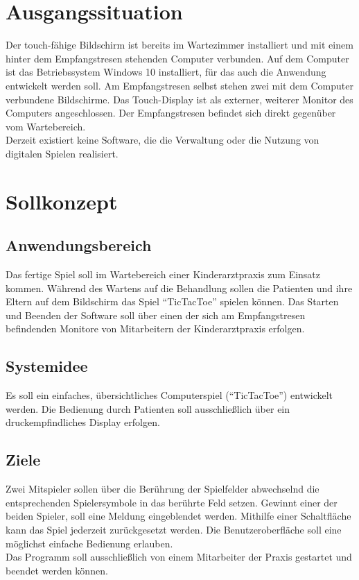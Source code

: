 \documentclass[12pt]{article}
\begin{document}
\section{Ausgangssituation}
Der touch-fähige Bildschirm ist bereits im Wartezimmer installiert und mit einem hinter dem \Gls{Empfangstresen} stehenden Computer verbunden. Auf dem Computer ist das Betriebssystem Windows 10 installiert, für das auch die Anwendung entwickelt werden soll. Am \Gls{Empfangstresen} selbst stehen zwei mit dem Computer verbundene Bildschirme. Das Touch-Display ist als externer, weiterer Monitor des Computers angeschlossen. Der \Gls{Empfangstresen} befindet sich direkt gegenüber vom Wartebereich.\\
Derzeit existiert keine Software, die die Verwaltung oder die Nutzung von digitalen Spielen realisiert.

\section{Sollkonzept}
\subsection{Anwendungsbereich}
Das fertige Spiel soll im Wartebereich einer Kinderarztpraxis zum Einsatz kommen. Während des Wartens auf die Behandlung sollen die Patienten und ihre Eltern auf dem Bildschirm das Spiel "`\Gls{TicTacToe}"' spielen können. Das Starten und Beenden der Software soll über einen der sich am Empfangstresen befindenden Monitore von Mitarbeitern der Kinderarztpraxis erfolgen.

\subsection{Systemidee}
Es soll ein einfaches, übersichtliches Computerspiel ("`\Gls{TicTacToe}"') entwickelt werden. Die Bedienung durch Patienten soll ausschließlich über ein druckempfindliches Display erfolgen.

\subsection{Ziele}
Zwei Mitspieler sollen über die Berührung der Spielfelder abwechselnd die entsprechenden Spielersymbole in das berührte Feld setzen. Gewinnt einer der beiden Spieler, soll eine Meldung eingeblendet werden. Mithilfe einer Schaltfläche kann das Spiel jederzeit zurückgesetzt werden. Die Benutzeroberfläche soll eine möglichst einfache Bedienung erlauben.\\
Das Programm soll ausschließlich von einem Mitarbeiter der Praxis gestartet und beendet werden können. \\
\end{document}
